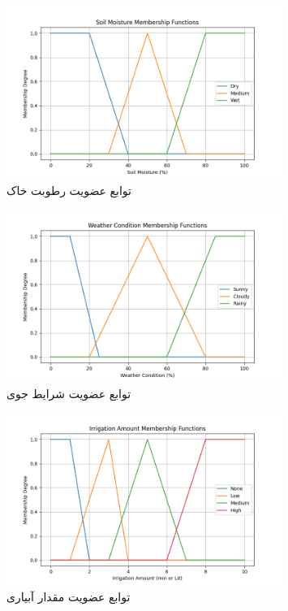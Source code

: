 \documentclass[12pt]{exam}
\begin{document}
	\begin{figure}[h]
		\centering
		\includegraphics[width=0.8\textwidth]{soil_membership.png}
		\caption{توابع عضویت رطوبت خاک}
		\label{fig:soil_membership}
	\end{figure}
	\begin{figure}[h]
		\centering
		\includegraphics[width=0.8\textwidth]{weather_membership.png}
		\caption{توابع عضویت شرایط جوی}
		\label{fig:weather_membership}
	\end{figure}
	\begin{figure}[h]
		\centering
		\includegraphics[width=0.8\textwidth]{irrigation_membership.png}
		\caption{توابع عضویت مقدار آبیاری}
		\label{fig:irrigation_membership}
	\end{figure}
\end{document}
